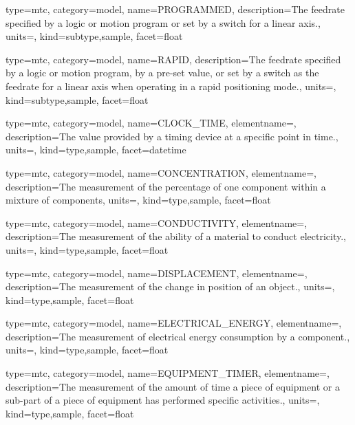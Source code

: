 {
  type=mtc,
  category=model,
  name={PROGRAMMED},
  description={The feedrate specified by a logic or motion program or set by a switch for a linear axis.},
  units=,
  kind={subtype,sample},
  facet={\gls{float}}
}


{
  type=mtc,
  category=model,
  name={RAPID},
  description={The feedrate specified by a logic or motion program, by a pre-set value, or set by a switch as the feedrate for a linear axis when operating in a rapid positioning mode.},
  units=,
  kind={subtype,sample},
  facet={\gls{float}}
}


{
  type=mtc,
  category=model,
  name={CLOCK\_TIME},
  elementname=,
  description={The value provided by a timing device at a specific point in time.},
  units=,
  kind={type,sample},
  facet={\gls{datetime}}
}


{
  type=mtc,
  category=model,
  name={CONCENTRATION},
  elementname=,
  description={The measurement of the percentage of one component within a mixture of components},
  units=,
  kind={type,sample},
  facet={\gls{float}}
}


{
  type=mtc,
  category=model,
  name={CONDUCTIVITY},
  elementname=,
  description={The measurement of the ability of a material to conduct electricity.},
  units=,
  kind={type,sample},
  facet={\gls{float}}
}


{
  type=mtc,
  category=model,
  name={DISPLACEMENT},
  elementname=,
  description={The measurement of the change in position of an object.},
  units=,
  kind={type,sample},
  facet={\gls{float}}
}


{
  type=mtc,
  category=model,
  name={ELECTRICAL\_ENERGY},
  elementname=,
  description={The measurement of electrical energy consumption by a component.},
  units=,
  kind={type,sample},
  facet={\gls{float}}
}


{
  type=mtc,
  category=model,
  name={EQUIPMENT\_TIMER},
  elementname=,
  description={The measurement of the amount of time a piece of equipment or a sub-part of a piece of equipment has performed specific activities.},
  units=,
  kind={type,sample},
  facet={\gls{float}}
}


